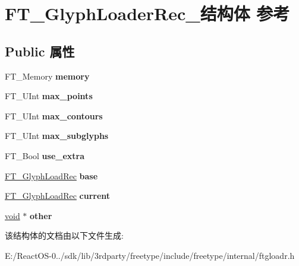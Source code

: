 \hypertarget{struct_f_t___glyph_loader_rec__}{}\section{F\+T\+\_\+\+Glyph\+Loader\+Rec\+\_\+结构体 参考}
\label{struct_f_t___glyph_loader_rec__}
\subsection*{Public 属性}
\begin{DoxyCompactItemize}
\item 
\mbox{\label{struct_f_t___glyph_loader_rec___a9120a7808ee59d24dd52409e609907a2}} 
F\+T\+\_\+\+Memory {\bfseries memory}
\item 
\mbox{\label{struct_f_t___glyph_loader_rec___a62339fa7a06e0b4ddecd5db2aa606741}} 
F\+T\+\_\+\+U\+Int {\bfseries max\+\_\+points}
\item 
\mbox{\label{struct_f_t___glyph_loader_rec___a808ccf46597572d953f387e705f10a36}} 
F\+T\+\_\+\+U\+Int {\bfseries max\+\_\+contours}
\item 
\mbox{\label{struct_f_t___glyph_loader_rec___a2d5b00d7caf624ed2b4f6fd2db3228db}} 
F\+T\+\_\+\+U\+Int {\bfseries max\+\_\+subglyphs}
\item 
\mbox{\label{struct_f_t___glyph_loader_rec___a54009985acda32d83f2f124e28c5d00a}} 
F\+T\+\_\+\+Bool {\bfseries use\+\_\+extra}
\item 
\mbox{\label{struct_f_t___glyph_loader_rec___ae80dfc17f20bfce8c60ffaaba95c821b}} 
\hyperlink{struct_f_t___glyph_load_rec__}{F\+T\+\_\+\+Glyph\+Load\+Rec} {\bfseries base}
\item 
\mbox{\label{struct_f_t___glyph_loader_rec___a271b1b9604746ed08cf6613710ebb4c1}} 
\hyperlink{struct_f_t___glyph_load_rec__}{F\+T\+\_\+\+Glyph\+Load\+Rec} {\bfseries current}
\item 
\mbox{\label{struct_f_t___glyph_loader_rec___a9c58c5b06f0135fe5cef16bd85d939e3}} 
\hyperlink{interfacevoid}{void} $\ast$ {\bfseries other}
\end{DoxyCompactItemize}


该结构体的文档由以下文件生成\+:\begin{DoxyCompactItemize}
\item 
E\+:/\+React\+O\+S-\/0../sdk/lib/3rdparty/freetype/include/freetype/internal/ftgloadr.\+h\end{DoxyCompactItemize}
